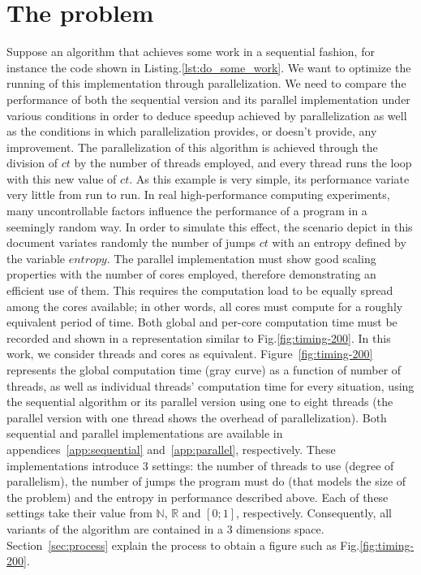 \section{The problem}
\label{sec:problem}
Suppose an algorithm that achieves some work in a sequential fashion, for instance the code shown in Listing.\ref{lst:do_some_work}. We want to optimize the running of this implementation through parallelization. We need to compare the performance of both the sequential version and its parallel implementation under various conditions in order to deduce speedup achieved by parallelization as well as the conditions in which parallelization provides, or doesn't provide, any improvement. The parallelization of this algorithm is achieved through the division of $ct$ by the number of threads employed, and every thread runs the loop with this new value of $ct$. As this example is very simple, its performance variate very little from run to run. In real high-performance computing experiments, many uncontrollable factors influence the performance of a program in a seemingly random way. In order to simulate this effect, the scenario depict in this document variates randomly the number of jumps $ct$ with an entropy defined by the variable $entropy$.
The parallel implementation must show good scaling properties with the number of cores employed, therefore demonstrating an efficient use of them. This requires the computation load to be equally spread among the cores available; in other words, all cores must compute for a roughly equivalent period of time. Both global and per-core computation time must be recorded and shown in a representation similar to Fig.\ref{fig:timing-200}. In this work, we consider threads and cores as equivalent. Figure~\ref{fig:timing-200} represents the global computation time (gray curve) as a function of number of threads, as well as individual threads' computation time for every situation, using the sequential algorithm or its parallel version using one to eight threads (the parallel version with one thread shows the overhead of parallelization). Both sequential and parallel implementations are available in appendices~\ref{app:sequential} and~\ref{app:parallel}, respectively. These implementations introduce 3 settings: the number of threads to use (degree of parallelism), the number of jumps the program must do (that models the size of the problem) and the entropy in performance described above. Each of these settings take their value from $\mathbb{N}$, $\mathbb{R}$ and $\left[0;1\right]$, respectively. Consequently, all variants of the algorithm are contained in a 3 dimensions space. Section~\ref{sec:process} explain the process to obtain a figure such as Fig.\ref{fig:timing-200}.

